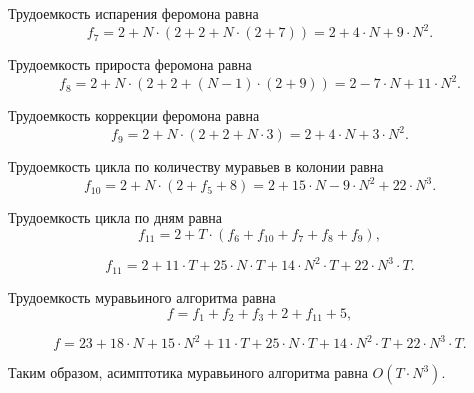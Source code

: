 Трудоемкость испарения феромона равна
\begin{equation}
	f_7 = 2 + N \cdot (2 + 2 + N \cdot (2 + 7)) = 2 + 4 \cdot N + 9 \cdot N^2.
\end{equation}

Трудоемкость прироста феромона равна
\begin{equation}
	f_{8} = 2 + N \cdot (2 + 2 + (N - 1) \cdot (2 + 9)) = 2 - 7 \cdot N + 11 \cdot N^2.
\end{equation}

Трудоемкость коррекции феромона равна
\begin{equation}
	f_{9} = 2 + N \cdot (2 + 2 + N \cdot 3) = 2 + 4 \cdot N + 3 \cdot N^2.
\end{equation}

Трудоемкость цикла по количеству муравьев в колонии равна
\begin{equation}
	f_{10} = 2 + N \cdot (2 + f_5 + 8) = 2 + 15 \cdot N - 9 \cdot N^2 + 22 \cdot N^3.
\end{equation}

Трудоемкость цикла по дням равна
\begin{equation}
	f_{11} = 2 + T \cdot (f_{6} + f_{10} + f_{7} + f_{8} + f_{9}),
\end{equation}

\begin{equation}
	f_{11} = 2 + 11 \cdot T + 25 \cdot N \cdot T + 14 \cdot N^2 \cdot T + 22 \cdot N^3 \cdot T.
\end{equation}


Трудоемкость муравьиного алгоритма равна
\begin{equation} 
	f = f_{1} + f_{2} + f_{3} + 2 + f_{11} + 5,
\end{equation}

\begin{equation} 
	f = 23 + 18 \cdot N + 15 \cdot N^2 + 11 \cdot T + 25 \cdot N \cdot T + 14 \cdot N^2 \cdot T + 22 \cdot N^3 \cdot T.
\end{equation}

Таким образом, асимптотика муравьиного алгоритма равна $O(T \cdot N^3)$.

\newpage